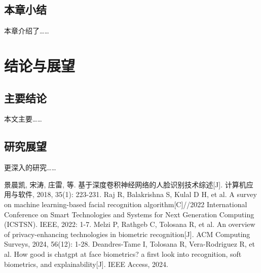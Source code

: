 \documentclass[UTF8,a4paper,12pt]{ctexart}
\numberwithin{equation}{section}
\begin{document}
\subsection{本章小结}
本章介绍了……

\newpage
{}
\section{结论与展望}

\subsection{主要结论}
本文主要……

\subsection{研究展望}
更深入的研究……

\newpage
{}

\renewcommand\refname{参考文献}


\begin{thebibliography}{1}
\setlength{\itemsep}{0pt}
 景晨凯, 宋涛, 庄雷, 等. 基于深度卷积神经网络的人脸识别技术综述[J]. 计算机应用与软件, 2018, 35(1): 223-231.
 Raj R, Balakrishna S, Kulal D H, et al. A survey on machine learning-based facial recognition algorithm[C]//2022 International Conference on Smart Technologies and Systems for Next Generation Computing (ICSTSN). IEEE, 2022: 1-7.
 Melzi P, Rathgeb C, Tolosana R, et al. An overview of privacy-enhancing technologies in biometric recognition[J]. ACM Computing Surveys, 2024, 56(12): 1-28.
 Deandres-Tame I, Tolosana R, Vera-Rodriguez R, et al. How good is chatgpt at face biometrics? a first look into recognition, soft biometrics, and explainability[J]. IEEE Access, 2024.
\end{thebibliography}
\end{document}
